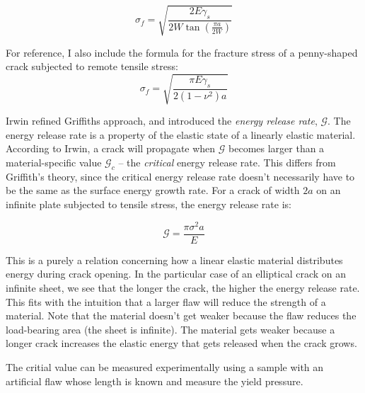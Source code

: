  \begin{equation}
 	\sigma_f = \sqrt{\frac{2E\gamma_s}{2W\tan\left( \frac{\pi a}{2W}\right)}}
 	\label{eq:griffith_finite_sheet}
 \end{equation}

For reference, I also include the formula for the fracture stress of a penny-shaped crack subjected to remote tensile stress:
\begin{equation}
	\sigma_f = \sqrt{\frac{\pi E \gamma_s }{2(1-\nu^2)a}}
\end{equation}
 


 Irwin refined Griffiths approach, and introduced the \emph{energy release rate}, $\mathcal{G}$. The energy release rate is a property of the elastic state of a linearly elastic material. According to Irwin, a crack will propagate when $\mathcal{G}$ becomes larger than a material-specific value $\mathcal{G}_c$ -- the \emph{critical} energy release rate. This differs from Griffith's theory, since the critical energy release rate doesn't necessarily have to be the same as the surface energy growth rate. For a crack of width $2a$ on an infinite plate subjected to tensile stress, the energy release rate is:

\begin{equation}
	\mathcal{G} = \frac{\pi \sigma^2 a}{E}
\end{equation}

This is a purely a relation concerning how a linear elastic material distributes energy during crack opening. In the particular case of an elliptical crack on an infinite sheet, we see that the longer the crack, the higher the energy release rate. This fits with the intuition that a larger flaw will reduce the strength of a material. Note that the material doesn't get weaker because the flaw reduces the load-bearing area (the sheet is infinite). The material gets weaker because a longer crack increases the elastic energy that gets released when the crack grows.

The critial value can be measured experimentally using a sample with an artificial flaw whose length is known and measure the yield pressure. 

